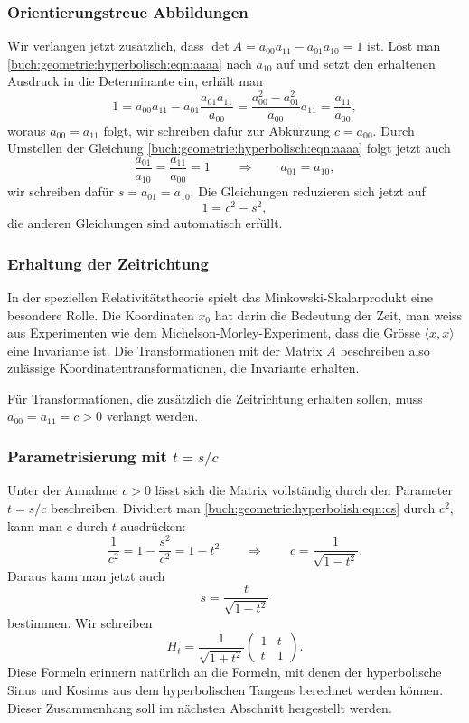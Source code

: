 %
%
\subsubsection{Orientierungstreue Abbildungen}
Wir verlangen jetzt zusätzlich, dass $\det A= a_{00}a_{11}-a_{01}{a_{10}} = 1$
ist.
Löst man \eqref{buch:geometrie:hyperbolisch:eqn:aaaa} nach $a_{10}$ auf
und setzt den erhaltenen Ausdruck in die Determinante ein, erhält man
\[
1
=
a_{00}a_{11} - a_{01} \frac{a_{01}a_{11}}{a_{00}} 
=
\frac{ a_{00}^2-a_{01}^2}{a_{00}} a_{11} 
=
\frac{a_{11}}{a_{00}},
\]
woraus $a_{00}=a_{11}$ folgt, wir schreiben dafür zur Abkürzung $c=a_{00}$.
Durch Umstellen der Gleichung \eqref{buch:geometrie:hyperbolisch:eqn:aaaa}
folgt jetzt auch
\[
\frac{a_{01}}{a_{10}} = \frac{a_{11}}{a_{00}} = 1
\qquad\Rightarrow\qquad
a_{01}=a_{10},
\]
wir schreiben dafür $s=a_{01}=a_{10}$.
Die Gleichungen reduzieren sich jetzt auf
\begin{equation}
1= c^2-s^2,
\label{buch:geometrie:hyperbolish:eqn:cs}
\end{equation}
die anderen Gleichungen sind automatisch erfüllt.

%
%
\subsubsection{Erhaltung der Zeitrichtung}
In der speziellen Relativitätstheorie spielt das Minkowski-Skalarprodukt
eine besondere Rolle.
Die Koordinaten $x_0$ hat darin die Bedeutung der Zeit,
man weiss aus Experimenten wie dem Michelson-Morley-Experiment,
dass die Grösse $\langle x,x\rangle$ eine Invariante ist.
Die Transformationen mit der Matrix $A$ beschreiben also zulässige
Koordinatentransformationen, die Invariante erhalten.

Für Transformationen, die zusätzlich die Zeitrichtung erhalten sollen,
muss $a_{00}=a_{11}=c>0$ verlangt werden.

%
%
\subsubsection{Parametrisierung mit $t=s/c$}
Unter der Annahme $c>0$ lässt sich die Matrix vollständig
durch den Parameter $t=s/c$ beschreiben.
Dividiert man \eqref{buch:geometrie:hyperbolish:eqn:cs} durch $c^2$,
kann man $c$ durch $t$ ausdrücken:
\[
\frac{1}{c^2}
=
 1-\frac{s^2}{c^2}
=
1-t^2
\qquad\Rightarrow\qquad
c = \frac{1}{\sqrt{1-t^2}}.
\]
Daraus kann man jetzt auch 
\[
s=\frac{t}{\sqrt{1-t^2}}
\]
bestimmen.
Wir schreiben
\[
H_t
=
\frac{1}{\sqrt{1+t^2}}
\begin{pmatrix}
1&t\\
t&1
\end{pmatrix}.
\]
Diese Formeln erinnern natürlich an die Formeln, mit denen
der hyperbolische Sinus und Kosinus aus dem hyperbolischen
Tangens berechnet werden können.
Dieser Zusammenhang soll im nächsten Abschnitt hergestellt
werden.

